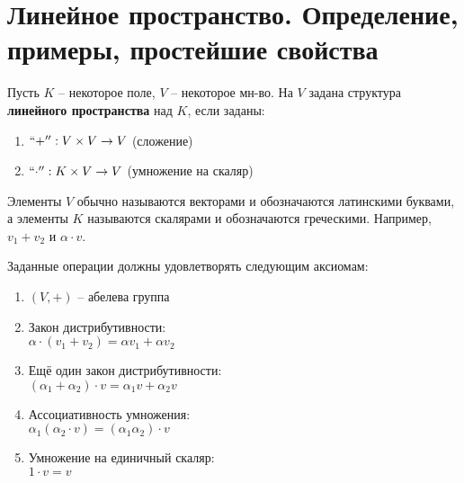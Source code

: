 
\section{Линейное пространство. Определение, примеры, простейшие свойства}

\begin{conj}
    Пусть $K$ -- некоторое поле, $V$ -- некоторое мн-во.
    На $V$ задана структура \textbf{линейного пространства} над $K$, 
    если заданы:
    \begin{enumerate}
        \item $``+'' : V \times V \to V$ (сложение)
        \item $``\cdot'' : K \times V \to V$ (умножение на скаляр) 
    \end{enumerate}

    Элементы $V$ обычно называются векторами и обозначаются латинскими
    буквами, а элементы $K$ называются скалярами и обозначаются греческими.
    Например, $v_1 + v_2$ и $\alpha \cdot v$.

    Заданные операции должны удовлетворять следующим аксиомам:
    \begin{enumerate}
        \item $(V, +)$ -- абелева группа
        \item Закон дистрибутивности: \\
        $\alpha \cdot (v_1 + v_2) = \alpha v_1 + \alpha v_2$
        \item Ещё один закон дистрибутивности: \\
        $(\alpha_1 + \alpha_2) \cdot v = \alpha_1 v + \alpha_2 v$
        \item Ассоциативность умножения:\\
        $ \alpha_1 (\alpha_2 \cdot v) = (\alpha_1 \alpha_2) \cdot v $
        \item Умножение на единичный скаляр: \\
        $ 1 \cdot v = v $
    \end{enumerate}
\end{conj}

